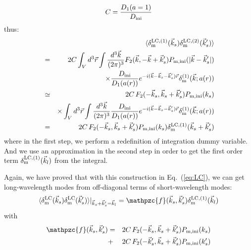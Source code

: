 \documentclass[prd,amsmath,amssymb,floatfix,superscriptaddress,nofootinbib,twocolumn]{revtex4-1}
\def\be{\begin{equation}}
\def\ee{\end{equation}}
\def\bea{\begin{eqnarray}}
\def\eea{\end{eqnarray}}
\newcommand{\LC}{\rm LC}
\newcommand{\ini}{\rm ini}
\newcommand{\vrr}{\vec{r}}
\newcommand{\vs}{\nonumber\\}
\newcommand{\vk}{\vec{k}}
\newcommand{\ec}[1]{Eq.~(\ref{eq:#1})}
\newcommand{\eql}[1]{\label{eq:#1}}
\begin{document}
\be 
C=\frac{D_{1}(a=1)}{D_{\rm ini}}
\ee 
thus:
\bea 
&& \langle \delta^{\rm LC,(1)}_{\rm m}(\vk_s)\delta^{\rm LC,(2)}_{\rm m}(\vk_s') \rangle \vs 
&=&2C\int_{V} d^{3} \vrr\int \frac{d^{3}\vk}{(2\pi)^3}F_2(\vk,-\vk+\vk_s')P_{\rm m,\ini}(|\vk-\vk_s'|) \vs
&&\times \frac{D_{\ini}}{D_{1}(a(r))}e^{-i(\vk-\vk_s-\vk_s')\vrr}\delta_{\rm m}^{(1)}(\vk;a(r)) \vs
&\simeq & 2C\,F_{2}(-\vk_s,\vk_s+\vk_s')P_{\rm m,\ini}(k_s) \vs
&& \times \int_{V} d^{3} \vrr\int \frac{d^{3}\vk}{(2\pi)^3}\frac{D_{\ini}}{D_{1}(a(r))}e^{-i(\vk-\vk_s-\vk_s')\vrr}\delta_{\rm m}^{(1)}(\vk;a(r))\vs
&= &2C\,F_{2}(-\vk_s,\vk_s+\vk_s')P_{\rm m,\ini}(k_s)\delta_{\rm m}^{\rm LC,(1)}(\vk_s+\vk_s')
\eea 
where in the first step, we perform a redefinition of integration dummy variable. And we use an approximation in the second step in order to get the first order term $\delta_{\rm m}^{\rm LC,(1)}(\vk_l)$ from the integral. 

Again, we have proved that with this construction in \ec{LC}, we can get long-wavelength modes from off-diagonal terms of short-wavelength modes:
\be 
\langle \delta^{\LC}_{\rm m}(\vk_s)\delta^{\LC}_{\rm m}(\vk_s') \rangle|_{\vk_s+\vk_s'=\vk_l} =\mathpzc{f}(\vec{k}_s,\vec{k}_s'){\delta}^{\rm LC,(1)}_{\rm m}(\vec{k}_l) \eql{2pt}
\ee 
with 
\bea
\mathpzc{f}(\vec{k}_s,\vec{k}_s')&=&2C\,F_2(-\vec{k}_s,\vec{k}_s+\vec{k}_s')P_{\rm m,ini}(k_s)\vs
&+&2C\,F_2(-\vec{k}_s',\vec{k}_s+\vec{k}_s')P_{\rm m,ini}(k_s')       
\eea 
\end{document}
